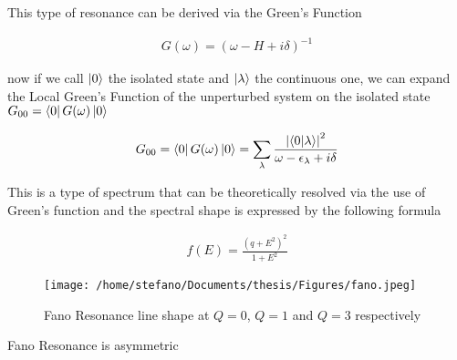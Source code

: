 This type of resonance can be derived via the Green's Function

\begin{eqnarray}\label{eq:Green}
	G(\omega) = \left( \omega - H + i\delta \right)^{-1}
\end{eqnarray}

now if we call $\ket{0}$ the isolated state and $\ket{\lambda}$ the continuous one, we can expand the Local Green's Function of the unperturbed system on the isolated state $G_{00} = \bra{0} G(\omega) \ket{0}$ 

\begin{eqnarray}
	G_{00} = \bra{0} G(\omega) \ket{0} = \sum_{\lambda} \frac{ \abs{\bra{0}\ket{\lambda} }^2 }{ \omega -\epsilon_{\lambda} + i\delta }%
\end{eqnarray}

This is a type of spectrum that can be theoretically resolved via the use of Green's function and the spectral shape is expressed by the following formula

\begin{eqnarray}\label{eq:Fano}
	f(E) = \frac{ ( q + E^2 )^2 }{ 1 + E^2 }
\end{eqnarray}

\begin{figure}[ht!]
	\centering %
		\texttt{[image: /home/stefano/Documents/thesis/Figures/fano.jpeg]}
	\caption{Fano Resonance line shape at $Q= 0$, $Q = 1$ and $Q = 3$ respectively}
\end{figure}

Fano Resonance is asymmetric 
